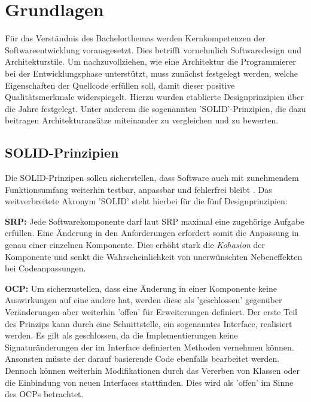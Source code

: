 

\chapter{Grundlagen}

Für das Verständnis des Bachelorthemas werden Kernkompetenzen der Softwareentwicklung vorausgesetzt. Dies betrifft vornehmlich Softwaredesign und Architekturstile. Um nachzuvollziehen, wie eine Architektur die Programmierer bei der Entwicklungsphase unterstützt, muss zunächst festgelegt werden, welche Eigenschaften der Quellcode erfüllen soll, damit dieser positive Qualitätsmerkmale widerspiegelt. Hierzu wurden etablierte Designprinzipien über die Jahre festgelegt. Unter anderem die sogenannten 'SOLID'-Prinzipien, die dazu beitragen Architekturansätze miteinander zu vergleichen und zu bewerten.

\section{SOLID-Prinzipien}

Die SOLID-Prinzipen sollen sicherstellen, dass Software auch mit zunehmendem Funktionsumfang weiterhin testbar, anpassbar und fehlerfrei bleibt \cite{Martin.2000, Martin.2018}. Das weitverbreitete Akronym 'SOLID' steht hierbei für die fünf Designprinzipien:

\textbf{\acrfull{SRP}: } {Jede Softwarekomponente darf laut SRP maximal eine zugehörige Aufgabe erfüllen. Eine Änderung in den Anforderungen erfordert somit die Anpassung in genau einer einzelnen Komponente. Dies erhöht stark die \emph{\Gls{Kohasion}} der Komponente und senkt die Wahrscheinlichkeit von unerwünschten Nebeneffekten bei Codeanpassungen. \cite{Martin.SRP, Martin.2018}}

\textbf{\acrfull{OCP}: } Um sicherzustellen, dass eine Änderung in einer Komponente keine Auswirkungen auf eine andere hat, werden diese als 'geschlossen' gegenüber Veränderungen aber weiterhin 'offen' für Erweiterungen definiert. Der erste Teil des Prinzips kann durch eine Schnittstelle, ein sogenanntes Interface, realisiert werden. Es gilt als geschlossen, da die Implementierungen keine Signaturänderungen der im Interface definierten Methoden vernehmen können. Ansonsten müsste der darauf basierende Code ebenfalls bearbeitet werden. Dennoch können weiterhin Modifikationen durch das Vererben von Klassen oder die Einbindung von neuen Interfaces stattfinden. Dies wird als 'offen' im Sinne des OCPs betrachtet. \cite{Martin.2018, Meyer.2009}

